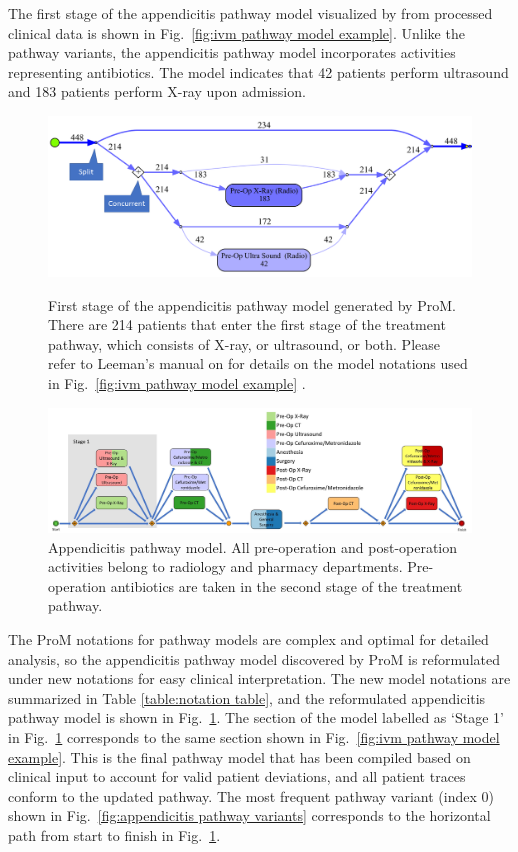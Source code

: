 The first stage of the appendicitis pathway model visualized by  from processed clinical data is shown in Fig.~\ref{fig:ivm pathway model example}. Unlike the pathway variants, the appendicitis pathway model incorporates activities representing antibiotics. The model indicates that 42 patients perform ultrasound and 183 patients perform X-ray upon admission. 

\begin{figure}[t]
\includegraphics[width=\textwidth]{images/ivm_appendicitis_first_stage_example.png}
\caption{First stage of the appendicitis pathway model generated by
  ProM. There are 214 patients that enter the first stage of the
  treatment pathway, which consists of X-ray, or ultrasound, or both.
  Please refer to Leeman's manual on  for details on the model notations used in  Fig.~\ref{fig:ivm pathway model example} \cite{leemansinductive}.}
\label{fig:ivm pathway model example}

\includegraphics[width=\textwidth]{images/communicative_appendicitis_process_models_anes.jpg}
\caption{Appendicitis pathway model. All pre-operation and post-operation activities belong to radiology and pharmacy departments. Pre-operation antibiotics are taken in the second stage of the treatment pathway.}
\label{fig:appendicitis pathway model}
\end{figure}

The ProM notations for pathway models are complex and optimal for detailed analysis, so the appendicitis pathway model discovered by ProM is reformulated under new notations for easy clinical interpretation. The new model notations are summarized in Table \ref{table:notation table}, and the reformulated appendicitis pathway model is shown in Fig.~\ref{fig:appendicitis pathway model}. The section of the model labelled as `Stage 1' in Fig.~\ref{fig:appendicitis pathway model} corresponds to the same section shown in Fig.~\ref{fig:ivm pathway model example}. This is the final pathway model that has been compiled based on clinical input to account for valid patient deviations, and all patient traces conform to the updated pathway. The most frequent pathway variant (index 0) shown in Fig.~\ref{fig:appendicitis pathway variants} corresponds to the horizontal path from start to finish in Fig.~\ref{fig:appendicitis pathway model}.

